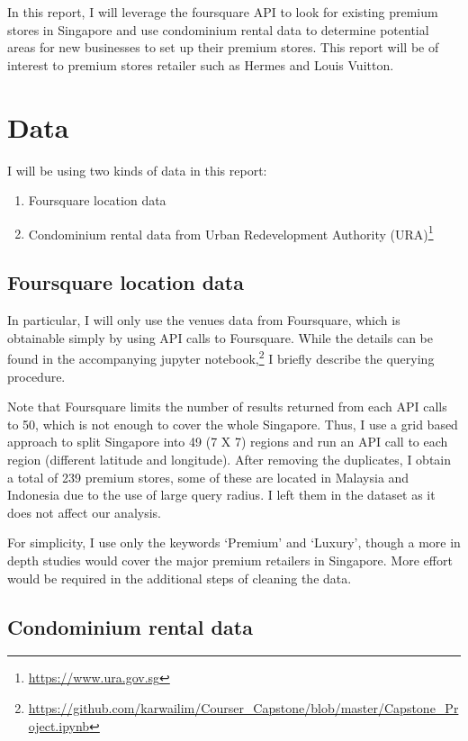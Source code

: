 \documentclass[oneside,11pt]{article}
\begin{document}
In this report, I will leverage the foursquare API to look for 
existing premium stores in Singapore and use condominium rental data
to determine potential areas for new businesses to set up their premium 
stores. This report will be of interest to premium stores retailer such
as Hermes and Louis Vuitton.


\section{Data}

I will be using two kinds of data in this report:
\begin{enumerate}
\item
  Foursquare location data
\item
  Condominium rental data from Urban Redevelopment Authority (URA)\footnote{\href{https://www.ura.gov.sg}{https://www.ura.gov.sg}}
\end{enumerate}


\subsection{Foursquare location data}

In particular, I will only use the venues data from Foursquare, 
which is obtainable simply by using API calls to Foursquare. While the 
details can be found in the accompanying jupyter notebook,\footnote{\href{https://github.com/karwailim/Coursera_Capstone/blob/master/Capstone_Project.ipynb}{https://github.com/karwailim/Courser\_Capstone/blob/master/Capstone\_Project.ipynb}}
I briefly describe the querying procedure.

Note that Foursquare limits the number of results returned from each API calls to 50, which is not enough to cover the whole Singapore. Thus, I use a grid based approach to split Singapore into 49 (7 X 7) regions and run an API call to each 
region (different latitude and longitude). After removing the duplicates, I obtain a total of 239 premium stores, some of these are located in Malaysia and Indonesia due to the use of large query radius. I left them in the dataset as it does not affect our analysis.

For simplicity, I use only the keywords `Premium' and `Luxury', though a more in depth studies would cover the major premium retailers in Singapore. More effort would be required in the additional steps of cleaning the data.

\subsection{Condominium rental data}
\end{document}
